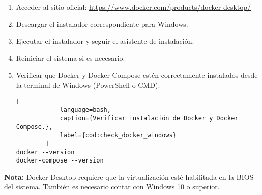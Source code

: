 \begin{enumerate}
    \item Acceder al sitio oficial: \href{https://www.docker.com/products/docker-desktop/}{https://www.docker.com/products/docker-desktop/}
    
    \item Descargar el instalador correspondiente para Windows.

    \item Ejecutar el instalador y seguir el asistente de instalación.

    \item Reiniciar el sistema si es necesario.

    \item Verificar que Docker y Docker Compose estén correctamente instalados desde la terminal de Windows (PowerShell o CMD):
    \begin{lstlisting}[
			language=bash,
			caption={Verificar instalación de Docker y Docker Compose.},
			label={cod:check_docker_windows}
		]
docker --version
docker-compose --version
    \end{lstlisting}
\end{enumerate}

\textbf{Nota:} Docker Desktop requiere que la virtualización esté habilitada en la BIOS del sistema. También es necesario contar con Windows 10 o superior.

